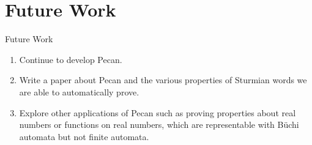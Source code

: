 \documentclass[leqno,presentation,usenames,dvipsnames]{beamer}
\begin{document}
\section{Future Work}
\begin{frame}{Future Work}
    \begin{enumerate}
        \item Continue to develop Pecan.
        \item Write a paper about Pecan and the various properties of Sturmian words we are able to automatically prove.
        \item Explore other applications of Pecan such as proving properties about real numbers or functions on real numbers, which are representable with B\"uchi automata but not finite automata.
    \end{enumerate}
\end{frame}
\end{document}

